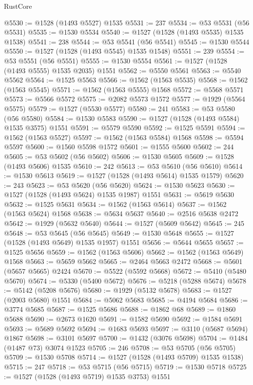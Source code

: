 \begin{lexlean}{RustCore}
\begin{coremodule}
@5530 := @1528 (@1493 @5527) @1535
@5531 := 237
@5534 := @53 @5531 (@56 @5531)
@5535 := @1530 @5534
@5540 := @1527 (@1528 (@1493 @5535) @1535 @1538)
@5541 := 238
@5544 := @53 @5541 (@56 @5541)
@5545 := @1530 @5544
@5550 := @1527 (@1528 (@1493 @5545) @1535 @1548)
@5551 := 239
@5554 := @53 @5551 (@56 @5551)
@5555 := @1530 @5554
@5561 := @1527 (@1528 (@1493 @5555) @1535 @2035) @1551
@5562 := @5550 @5561
@5563 := @5540 @5562
@5564 := @1525 @5563
@5566 := @1562 (@1563 @5535)
@5568 := @1562 (@1563 @5545)
@5571 := @1562 (@1563 @5555) @1568
@5572 := @5568 @5571
@5573 := @5566 @5572
@5575 := @2082 @5573 @1572
@5577 := @1929 (@5564 @5575)
@5579 := @1527 (@5530 @5577)
@5580 := 241
@5583 := @53 @5580 (@56 @5580)
@5584 := @1530 @5583
@5590 := @1527 (@1528 (@1493 @5584) @1535 @3575) @1551
@5591 := @5579 @5590
@5592 := @1525 @5591
@5594 := @1562 (@1563 @5527)
@5597 := @1562 (@1563 @5584) @1568
@5598 := @5594 @5597
@5600 := @1560 @5598 @1572
@5601 := @1555 @5600
@5602 := 244
@5605 := @53 @5602 (@56 @5602)
@5606 := @1530 @5605
@5609 := @1528 (@1493 @5606) @1535
@5610 := 242
@5613 := @53 @5610 (@56 @5610)
@5614 := @1530 @5613
@5619 := @1527 (@1528 (@1493 @5614) @1535 @1579)
@5620 := 243
@5623 := @53 @5620 (@56 @5620)
@5624 := @1530 @5623
@5630 := @1527 (@1528 (@1493 @5624) @1535 @1987) @1551
@5631 := @5619 @5630
@5632 := @1525 @5631
@5634 := @1562 (@1563 @5614)
@5637 := @1562 (@1563 @5624) @1568
@5638 := @5634 @5637
@5640 := @2516 @5638 @2472
@5642 := @1929 (@5632 @5640)
@5644 := @1527 (@5609 @5642)
@5645 := 245
@5648 := @53 @5645 (@56 @5645)
@5649 := @1530 @5648
@5655 := @1527 (@1528 (@1493 @5649) @1535 @1957) @1551
@5656 := @5644 @5655
@5657 := @1525 @5656
@5659 := @1562 (@1563 @5606)
@5662 := @1562 (@1563 @5649) @1568
@5663 := @5659 @5662
@5665 := @2464 @5663 @2472
@5668 := @5601 (@5657 @5665) @2424
@5670 := @5522 (@5592 @5668)
@5672 := @5410 (@5480 @5670)
@5674 := @5330 (@5400 @5672)
@5676 := @5218 (@5288 @5674)
@5678 := @5142 (@5208 @5676)
@5680 := @1929 (@5132 @5678)
@5683 := @1527 (@2003 @5680) @1551
@5684 := @5062 @5683
@5685 := @4194 @5684
@5686 := @3774 @5685
@5687 := @1525 @5686
@5688 := @1862 @68
@5689 := @1860 @5688
@5690 := @2673 @1620
@5691 := @1582 @5690
@5692 := @1584 @5691
@5693 := @5689 @5692
@5694 := @1683 @5693
@5697 := @3110 (@5687 @5694) @1867
@5698 := @3101 @5697
@5700 := @1432 (@3076 @5698)
@5704 := @1484 (@1487 @73) @3074 @1523
@5705 := 246
@5708 := @53 @5705 (@56 @5705)
@5709 := @1530 @5708
@5714 := @1527 (@1528 (@1493 @5709) @1535 @1538)
@5715 := 247
@5718 := @53 @5715 (@56 @5715)
@5719 := @1530 @5718
@5725 := @1527 (@1528 (@1493 @5719) @1535 @3753) @1551

\end{coremodule}
\end{lexlean}
